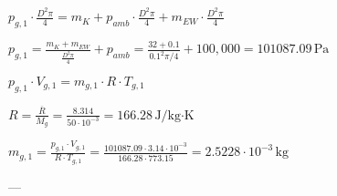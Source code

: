 \( p_{g,1} \cdot \frac{D^2 \pi}{4} = m_K + p_{amb} \cdot \frac{D^2 \pi}{4} + m_{EW} \cdot \frac{D^2 \pi}{4} \)  

\( p_{g,1} = \frac{m_K + m_{EW}}{\frac{D^2 \pi}{4}} + p_{amb} = \frac{32 + 0.1}{0.1^2 \pi / 4} + 100,000 = 101087.09 \, \text{Pa} \)  

\( p_{g,1} \cdot V_{g,1} = m_{g,1} \cdot R \cdot T_{g,1} \)  

\( R = \frac{\overline{R}}{M_g} = \frac{8.314}{50 \cdot 10^{-3}} = 166.28 \, \text{J/kg·K} \)  

\( m_{g,1} = \frac{p_{g,1} \cdot V_{g,1}}{R \cdot T_{g,1}} = \frac{101087.09 \cdot 3.14 \cdot 10^{-3}}{166.28 \cdot 773.15} = 2.5228 \cdot 10^{-3} \, \text{kg} \)  

---